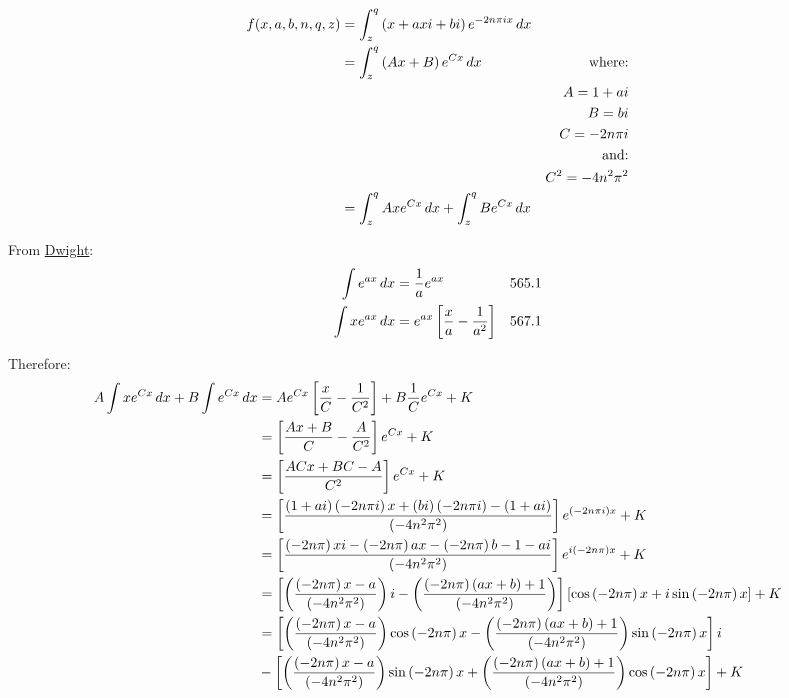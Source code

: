 \documentclass[10pt]{article}%
\begin{document}
\setlength{\baselineskip}{1.2\baselineskip}%

\begin{align}
f(x, a, b, n, q, z) &= \int_{z}^{q}{\left( x+axi+bi \right) e^{-2 n \pi i x} \,dx} \\
 &= \int_{z}^{q}{\left( Ax + B \right) e^{Cx} \,dx} &\text{where:} \\
 && A = 1 + ai \\
 && B = bi \\
 && C = -2n \pi i \\
 && \text{and:} \\
 && C^{2} = -4n^{2} \pi^{2} \\
 &= \int_{z}^{q}{Ax e^{Cx} \,dx} + \int_{z}^{q}{B e^{Cx} \,dx}
\end{align}

\divider

From \href{http://isbn.nu/}{Dwight}:
\begin{align}
 \int{e^{ax} \,dx} &= \frac{1}{a} e^{ax} & \text{565.1} \\
 \int{xe^{ax} \,dx} &= e^{ax}\left[ \frac{x}{a} - \frac{1}{a^{2}} \right] & \text{567.1}
\end{align}

\divider

Therefore:
\begin{align}
A \int{x e^{Cx} \,dx} + B\int{e^{Cx} \,dx} &= Ae^{Cx} \left[ \frac{x}{C} - \frac{1}{C^{2}}\right] + B \frac{1}{C} e^{Cx} + K \\
 &= \left[ \frac{Ax + B}{C} - \frac{A}{C^{2}}\right] e^{Cx} + K \\
 &= \left[ \frac{ACx + BC - A}{C^{2}}\right] e^{Cx} + K \\
 &= \left[ \frac{\left(1 + ai\right)\left(-2n \pi i\right)x + \left(bi\right)\left(-2n \pi i\right) - \left(1 + ai\right)}{\left(-4n^{2}\pi^{2}\right)} \right] e^{\left(-2n \pi i\right)x} + K \\
 &= \left[ \frac{\left(-2n\pi\right)xi - \left(-2n\pi\right)ax - \left(-2n\pi\right)b - 1 - ai}{\left(-4n^{2}\pi^{2}\right)} \right] e^{i\left(-2n\pi\right)x} + K \\
 &= \left[ \left(\frac{\left(-2n\pi\right)x - a}{\left(-4n^{2}\pi^{2}\right)} \right) i - \left(\frac{\left(-2n\pi\right)\left(ax + b\right) + 1}{\left(-4n^{2}\pi^{2}\right)}\right) \right] \left[ \cos{\left(-2n\pi\right)x} + i\sin{\left(-2n\pi\right)x}\right] + K \\
 &= \left[ \left(\frac{\left(-2n\pi\right)x - a}{\left(-4n^{2}\pi^{2}\right)} \right) \cos{\left(-2n\pi\right)x} 
 - \left(\frac{\left(-2n\pi\right)\left(ax + b\right) + 1}{\left(-4n^{2}\pi^{2}\right)}\right) \sin{\left(-2n\pi\right)x} \right] i \\
 &- \left[ \left(\frac{\left(-2n\pi\right)x - a}{\left(-4n^{2}\pi^{2}\right)} \right) \sin{\left(-2n\pi\right)x} 
 + \left(\frac{\left(-2n\pi\right)\left(ax + b\right) + 1}{\left(-4n^{2}\pi^{2}\right)}\right) \cos{\left(-2n\pi\right)x} \right] + K
\end{align}
\end{document}
